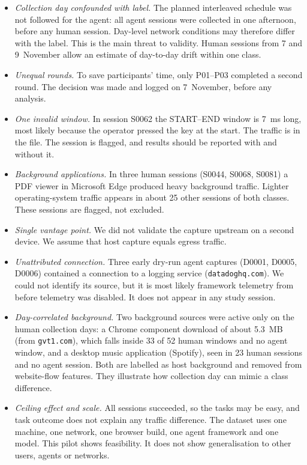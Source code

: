 \begin{itemize}
\item \textit{Collection day confounded with label.} The planned interleaved schedule was not followed for the agent: all agent sessions were collected in one afternoon, before any human session. Day-level network conditions may therefore differ with the label. This is the main threat to validity. Human sessions from 7 and 9~November allow an estimate of day-to-day drift within one class.
\item \textit{Unequal rounds.} To save participants' time, only P01--P03 completed a second round. The decision was made and logged on 7~November, before any analysis.
\item \textit{One invalid window.} In session S0062 the START--END window is 7~ms long, most likely because the operator pressed the key at the start. The traffic is in the file. The session is flagged, and results should be reported with and without it.
\item \textit{Background applications.} In three human sessions (S0044, S0068, S0081) a PDF viewer in Microsoft Edge produced heavy background traffic. Lighter operating-system traffic appears in about 25 other sessions of both classes. These sessions are flagged, not excluded.
\item \textit{Single vantage point.} We did not validate the capture upstream on a second device. We assume that host capture equals egress traffic.
\item \textit{Unattributed connection.} Three early dry-run agent captures (D0001, D0005, D0006) contained a connection to a logging service (\texttt{datadoghq.com}). We could not identify its source, but it is most likely framework telemetry from before telemetry was disabled. It does not appear in any study session.
\item \textit{Day-correlated background.} Two background sources were active only on the human collection days: a Chrome component download of about 5.3~MB (from \texttt{gvt1.com}), which falls inside 33 of 52 human windows and no agent window, and a desktop music application (Spotify), seen in 23 human sessions and no agent session. Both are labelled as host background and removed from website-flow features. They illustrate how collection day can mimic a class difference.
\item \textit{Ceiling effect and scale.} All sessions succeeded, so the tasks may be easy, and task outcome does not explain any traffic difference. The dataset uses one machine, one network, one browser build, one agent framework and one model. This pilot shows feasibility. It does not show generalisation to other users, agents or networks.
\end{itemize}

